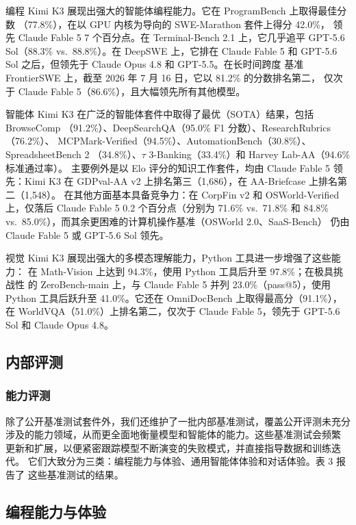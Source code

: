 \documentclass[
  10
]{article}
\begin{document}
编程 Kimi K3 展现出强大的智能体编程能力。它在 ProgramBench 上取得最佳分数
（77.8\%），在以 GPU 内核为导向的 SWE-Marathon 套件上得分 42.0\%，
领先 Claude Fable 5 7 个百分点。在 Terminal-Bench 2.1 上，它几乎追平
GPT-5.6 Sol（88.3\% vs.~88.8\%）。在 DeepSWE 上，它排在 Claude Fable 5
和 GPT-5.6 Sol 之后，但领先于 Claude Opus 4.8 和 GPT-5.5。在长时间跨度
基准 FrontierSWE 上，截至 2026 年 7 月 16 日，它以 81.2\% 的分数排名第二，
仅次于 Claude Fable 5（86.6\%），且大幅领先所有其他模型。

智能体 Kimi K3 在广泛的智能体套件中取得了最优（SOTA）结果，包括 BrowseComp
（91.2\%）、DeepSearchQA（95.0\% F1 分数）、ResearchRubrics（76.2\%）、
MCPMark-Verified（94.5\%）、AutomationBench（30.8\%）、SpreadsheetBench 2
（34.8\%）、$\tau$ 3-Banking（33.4\%）和 Harvey Lab-AA（94.6\% 标准通过率）。
主要例外是以 Elo 评分的知识工作套件，均由 Claude Fable 5 领先：Kimi K3
在 GDPval-AA v2 上排名第三（1,686），在 AA-Briefcase 上排名第二（1,548）。
在其他方面基本具备竞争力：在 CorpFin v2 和 OSWorld-Verified 上，仅落后
Claude Fable 5 0.2 个百分点（分别为 71.6\% vs.~71.8\% 和 84.8\%
vs.~85.0\%），而其余更困难的计算机操作基准（OSWorld 2.0、SaaS-Bench）
仍由 Claude Fable 5 或 GPT-5.6 Sol 领先。

视觉 Kimi K3 展现出强大的多模态理解能力，Python 工具进一步增强了这些能力：
在 Math-Vision 上达到 94.3\%，使用 Python 工具后升至 97.8\%；在极具挑战性
的 ZeroBench-main 上，与 Claude Fable 5 并列 23.0\%（pass@5），使用 Python
工具后跃升至 41.0\%。它还在 OmniDocBench 上取得最高分（91.1\%），在
WorldVQA（51.0\%）上排名第二，仅次于 Claude Fable 5，领先于 GPT-5.6 Sol
和 Claude Opus 4.8。

\subsection{内部评测}\label{internal-evaluation}

\subsubsection{能力评测}\label{capability-evaluation}

除了公开基准测试套件外，我们还维护了一批内部基准测试，覆盖公开评测未充分
涉及的能力领域，从而更全面地衡量模型和智能体的能力。这些基准测试会频繁
更新和扩展，以便紧密跟踪模型不断演变的失败模式，并直接指导数据和训练迭代。
它们大致分为三类：编程能力与体验、通用智能体体验和对话体验。表 3 报告了
这些基准测试的结果。

\subsection{编程能力与体验}\label{coding-capability-and-experience}
\end{document}
